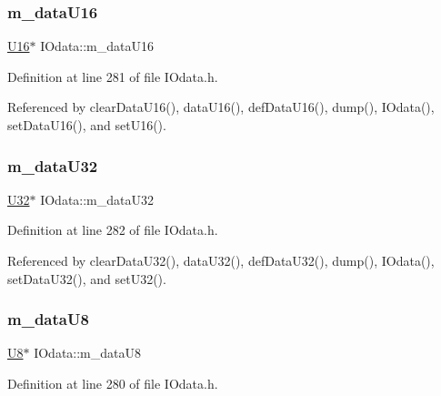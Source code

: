 \subsubsection{\texorpdfstring{m\+\_\+data\+U16}{m\_dataU16}}
{\footnotesize\ttfamily \hyperlink{classIOdata_a1eb45b348534a7c19a4a99b746e693ff}{U16}$\ast$ I\+Odata\+::m\+\_\+data\+U16\hspace{0.3cm}{\ttfamily [private]}}



Definition at line 281 of file I\+Odata.\+h.



Referenced by clear\+Data\+U16(), data\+U16(), def\+Data\+U16(), dump(), I\+Odata(), set\+Data\+U16(), and set\+U16().

\mbox{\label{classIOdata_a247cdaefd87084e3cad1d530d592d99a}} 
\subsubsection{\texorpdfstring{m\+\_\+data\+U32}{m\_dataU32}}
{\footnotesize\ttfamily \hyperlink{classIOdata_a96fb57f5fcd87b708743abd3c86a5198}{U32}$\ast$ I\+Odata\+::m\+\_\+data\+U32\hspace{0.3cm}{\ttfamily [private]}}



Definition at line 282 of file I\+Odata.\+h.



Referenced by clear\+Data\+U32(), data\+U32(), def\+Data\+U32(), dump(), I\+Odata(), set\+Data\+U32(), and set\+U32().

\mbox{\label{classIOdata_a9c4c0dc5104f7f3b170e30ab78fe61e7}} 
\subsubsection{\texorpdfstring{m\+\_\+data\+U8}{m\_dataU8}}
{\footnotesize\ttfamily \hyperlink{classIOdata_a18d1354b7cdaf0f8a8001fdbb3ced418}{U8}$\ast$ I\+Odata\+::m\+\_\+data\+U8\hspace{0.3cm}{\ttfamily [private]}}



Definition at line 280 of file I\+Odata.\+h.



